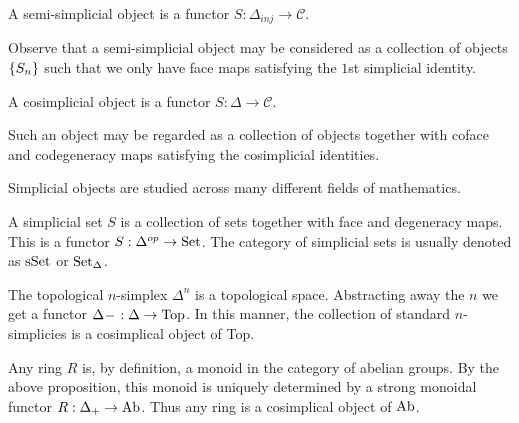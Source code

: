 \documentclass[../thesis.tex]{subfiles}
\begin{document}
        \begin{definition}
            A semi-simplicial object is a functor $S: \Delta_{inj} \rightarrow \mathcal{C}$.
        \end{definition}

        Observe that a semi-simplicial object may be considered as a collection of objects $\startset{S_n}$ such that we only have face maps satisfying the $1$st simplicial identity.
        
        \begin{definition}
            A cosimplicial object is a functor $S:\Delta\rightarrow \mathcal{C}$. 
        \end{definition}
        Such an object may be regarded as a collection of objects together with coface and codegeneracy maps satisfying the cosimplicial identities.
        
        Simplicial objects are studied across many different fields of mathematics.
        \begin{example}
            A simplicial set $S$ is a collection of sets together with face and degeneracy maps. This is a functor $S : \Delta^{op} \rightarrow \tt{Set}$. The category of simplicial sets is usually denoted as $\tt{sSet}$ or $\tt{Set}_\Delta$.
        \end{example}

        \begin{example}
            The topological $n$-simplex $\Delta^n$ is a topological space. Abstracting away the $n$ we get a functor $\Delta^{\argument} : \Delta \rightarrow \tt{Top}$. In this manner, the collection of standard $n$-simplicies is a cosimplical object of Top.
        \end{example}

        \begin{example}[Rings]
            Any ring $R$ is, by definition, a monoid in the category of abelian groups. By the above proposition, this monoid is uniquely determined by a strong monoidal functor $R: \Delta_+ \rightarrow \tt{Ab}$. Thus any ring is a cosimplical object of $\tt{Ab}$.
        \end{example}
\end{document}

